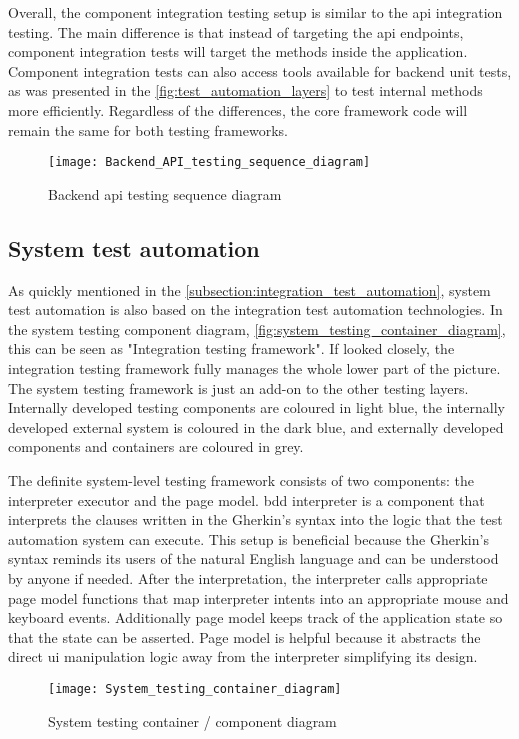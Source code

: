Overall, the component integration testing setup is similar to the \gls{api} integration testing. The main difference is that instead of targeting the \gls{api} endpoints, component integration tests will target the methods inside the application. Component integration tests can also access tools available for backend unit tests, as was presented in the \autoref{fig:test_automation_layers} to test internal methods more efficiently. Regardless of the differences, the core framework code will remain the same for both testing frameworks.

\begin{figure}
	\centering
	\texttt{[image: Backend\_API\_testing\_sequence\_diagram]}
	\caption{Backend \gls{api} testing sequence diagram}
	\label{fig:backend_API_testing_sequence_diagram}
\end{figure}

\FloatBarrier

\subsection{System test automation}
As quickly mentioned in the \autoref{subsection:integration_test_automation}, system test automation is also based on the integration test automation technologies. In the system testing component diagram, \autoref{fig:system_testing_container_diagram}, this can be seen as "Integration testing framework". If looked closely, the integration testing framework fully manages the whole lower part of the picture. The system testing framework is just an add-on to the other testing layers. Internally developed testing components are coloured in light blue, the internally developed external system is coloured in the dark blue, and externally developed components and containers are coloured in grey.

The definite system-level testing framework consists of two components: the  interpreter executor and the page model. \gls{bdd} interpreter is a component that interprets the clauses written in the Gherkin's syntax into the logic that the test automation system can execute. This setup is beneficial because the Gherkin's syntax reminds its users of the natural English language and can be understood by anyone if needed. After the interpretation, the interpreter calls appropriate page model functions that map interpreter intents into an appropriate mouse and keyboard events. Additionally page model keeps track of the application state so that the state can be asserted. Page model is helpful because it abstracts the direct \gls{ui} manipulation logic away from the interpreter simplifying its design.

\begin{figure}
	\centering
	\texttt{[image: System\_testing\_container\_diagram]}
	\caption{System testing container / component diagram}
	\label{fig:system_testing_container_diagram}
\end{figure}